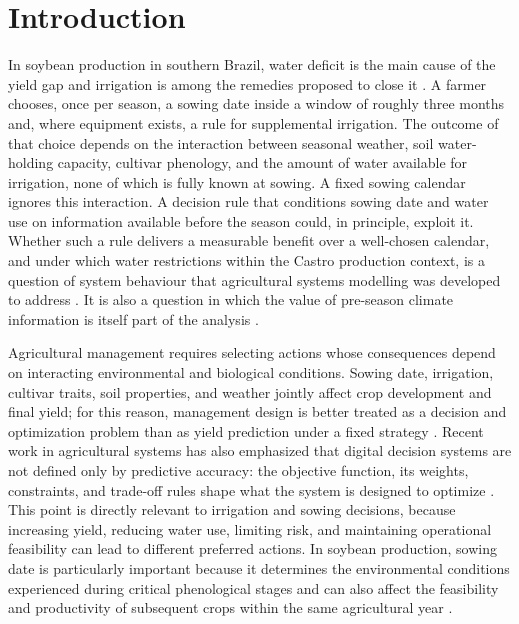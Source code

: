 \documentclass[times,final,authoryear]{elsarticle}
\begin{document}
\linenumbers

\section{Introduction}
\label{introduction}

In soybean production in southern Brazil, water deficit is the main cause of the yield gap and irrigation is among the remedies proposed to close it \citep{sentelhas2015yieldgap}. A farmer chooses, once per season, a sowing date inside a window of roughly three months and, where equipment exists, a rule for supplemental irrigation. The outcome of that choice depends on the interaction between seasonal weather, soil water-holding capacity, cultivar phenology, and the amount of water available for irrigation, none of which is fully known at sowing. A fixed sowing calendar ignores this interaction. A decision rule that conditions sowing date and water use on information available before the season could, in principle, exploit it. Whether such a rule delivers a measurable benefit over a well-chosen calendar, and under which water restrictions within the Castro production context, is a question of system behaviour that agricultural systems modelling was developed to address \citep{jones2017history}. It is also a question in which the value of pre-season climate information is itself part of the analysis \citep{hansen2002climate}.

Agricultural management requires selecting actions whose consequences depend on interacting environmental and biological conditions. Sowing date, irrigation, cultivar traits, soil properties, and weather jointly affect crop development and final yield; for this reason, management design is better treated as a decision and optimization problem than as yield prediction under a fixed strategy \citep{tao2022optimizing, Xiao2024}. Recent work in agricultural systems has also emphasized that digital decision systems are not defined only by predictive accuracy: the objective function, its weights, constraints, and trade-off rules shape what the system is designed to optimize \citep{carolan2026objective}. This point is directly relevant to irrigation and sowing decisions, because increasing yield, reducing water use, limiting risk, and maintaining operational feasibility can lead to different preferred actions. In soybean production, sowing date is particularly important because it determines the environmental conditions experienced during critical phenological stages and can also affect the feasibility and productivity of subsequent crops within the same agricultural year \citep{debangshi2025plantingdates, bigolin2025latesoybean, zhang2021modissoybean}.
\end{document}
